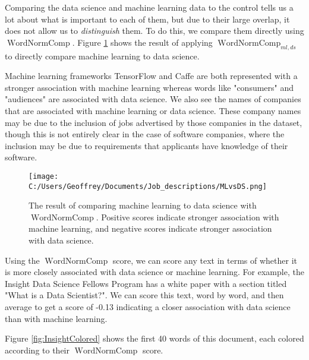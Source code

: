 \documentclass[12pt]{article}
\DeclareMathOperator{\WNp}{WordNormComp}
\begin{document}
Comparing the data science and machine learning data to the control tells us a lot about what is important to each of them, but due to their large overlap, it does not allow us to \textit{distinguish} them. To do this, we compare them directly using $\WNp$. Figure \ref{fig:WNp} shows the result of applying $\WNp_{ml,ds}$ to directly compare machine learning to data science.

Machine learning frameworks TensorFlow and Caffe are both represented with a stronger association with machine learning whereas words like "consumers" and "audiences" are associated with data science. We also see the names of companies that are associated with machine learning or data science. These company names may be due to the inclusion of jobs advertised by those companies in the dataset, though this is not entirely clear in the case of software companies, where the inclusion may be due to requirements that applicants have knowledge of their software. 

\begin{figure}[h]
\begin{center}
\texttt{[image: C:/Users/Geoffrey/Documents/Job\_descriptions/MLvsDS.png]}
\end{center}
\caption{\label{fig:WNp} The result of comparing machine learning to data science with $\WNp$. Positive scores indicate stronger association with machine learning, and negative scores indicate stronger association with data science.}
\end{figure}

Using the $\WNp$ score, we can score any text in terms of whether it is more closely associated with data science or machine learning. For example, the Insight Data Science Fellows Program has a white paper with a section titled "What is a Data Scientist?". We can score this text, word by word, and then average to get a score of -0.13 indicating a closer association with data science than with machine learning.

Figure \ref{fig:InsightColored} shows the first 40 words of this document, each colored according to their $\WNp$ score.
\end{document}
